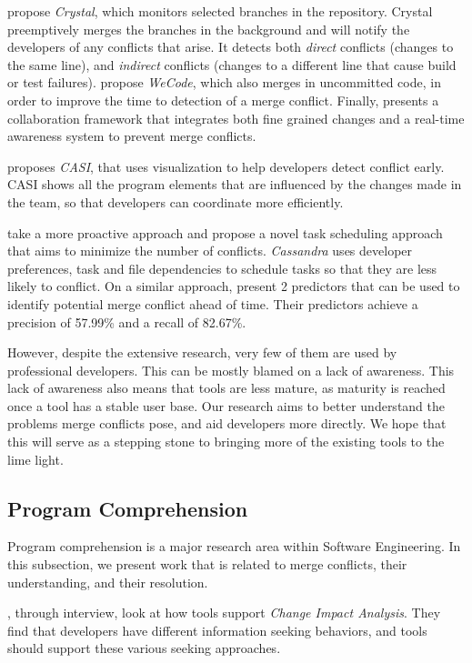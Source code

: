 \citet{Brun2011} propose \emph{Crystal}, which monitors selected branches in the repository. 
Crystal preemptively merges the branches in the background and will notify the developers of any conflicts that arise. 
It detects both \emph{direct} conflicts (changes to the same line), and \emph{indirect} conflicts (changes to a different line that cause build or test failures).
\citet{Guimaraes} propose \emph{WeCode}, which also merges in uncommitted code, in order to improve the time to detection of a merge conflict.
Finally, \citet{estler_unifying_2013} presents a collaboration framework that integrates both fine grained changes and a real-time awareness system to prevent merge conflicts.

\citet{servant_casi:_2010} proposes \emph{CASI}, that uses visualization to help developers detect conflict early.
CASI shows all the program elements that are influenced by the changes made in the team, so that developers can coordinate more efficiently.

\citet{cassandra} take a more proactive approach and propose a novel task scheduling approach that aims to minimize the number of conflicts. 
\emph{Cassandra} uses developer preferences, task and file dependencies to schedule tasks so that they are less likely to conflict.
On a similar approach, \citet{accioly_analyzing_2018} present 2 predictors that can be used to identify potential merge conflict ahead of time.
Their predictors achieve a precision of 57.99\% and a recall of 82.67\%.

However, despite the extensive research, very few of them are used by professional developers.
This can be mostly blamed on a lack of awareness.
This lack of awareness also means that tools are less mature, as maturity is reached once a tool has a stable user base.
Our research aims to better understand the problems merge conflicts pose, and aid developers more directly.
We hope that this will serve as a stepping stone to bringing more of the existing tools to the lime light.

\subsection{Program Comprehension}\label{sec:rw:pc}

Program comprehension is a major research area within Software Engineering.
In this subsection, we present work that is related to merge conflicts, their understanding, and their resolution.

\citet{borg2017software}, through interview, look at how tools support \emph{Change Impact Analysis}. 
They find that developers have different information seeking behaviors, and tools should support these various seeking approaches.

